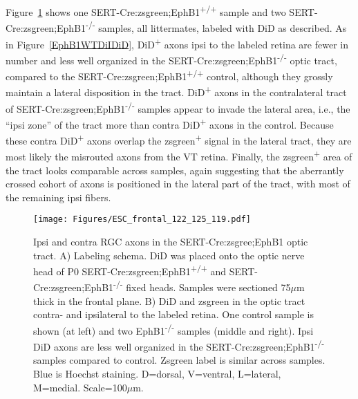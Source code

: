Figure~\ref{ESCfrontal} shows one SERT-Cre:zsgreen;EphB1\textsuperscript{+/+} sample and two SERT-Cre:zsgreen;EphB1\textsuperscript{-/-} samples, all littermates, labeled with DiD as described.
As in Figure~\ref{EphB1WTDiIDiD}, DiD\textsuperscript{+} axons ipsi to the labeled retina are fewer in number and less well organized in the SERT-Cre:zsgreen;EphB1\textsuperscript{-/-} optic tract, compared to the SERT-Cre:zsgreen;EphB1\textsuperscript{+/+} control, although they grossly maintain a lateral disposition in the tract.
DiD\textsuperscript{+} axons in the contralateral tract of SERT-Cre:zsgreen;EphB1\textsuperscript{-/-} samples appear to invade the lateral area, i.e., the ``ipsi zone'' of the tract more than contra DiD\textsuperscript{+} axons in the control.
Because these contra DiD\textsuperscript{+} axons overlap the zsgreen\textsuperscript{+} signal in the lateral tract, they are most likely the misrouted axons from the VT retina.
Finally, the zsgreen\textsuperscript{+} area of the tract looks comparable across samples, again suggesting that the aberrantly crossed cohort of axons is positioned in the lateral part of the tract, with most of the remaining ipsi fibers.
\begin{figure}[hbtp]
    \begin{center}
        \texttt{[image: Figures/ESC\_frontal\_122\_125\_119.pdf]}
        \caption[Ipsi and contra RGC axons in the SERT-Cre:zsgree;EphB1 optic tract.]
        {Ipsi and contra RGC axons in the SERT-Cre:zsgree;EphB1 optic tract.
        A) Labeling schema.
        DiD was placed onto the optic nerve head of P0 SERT-Cre:zsgreen;EphB1\textsuperscript{+/+} and SERT-Cre:zsgreen;EphB1\textsuperscript{-/-} fixed heads.
        Samples were sectioned 75$\mu$m thick in the frontal plane.
        B) DiD and zsgreen in the optic tract contra- and ipsilateral to the labeled retina.
        One control sample is shown (at left) and two EphB1\textsuperscript{-/-} samples (middle and right).
        Ipsi DiD axons are less well organized in the SERT-Cre:zsgreen;EphB1\textsuperscript{-/-} samples compared to control.
        Zsgreen label is similar across samples.
        Blue is Hoechst staining.
        D=dorsal, V=ventral, L=lateral, M=medial.
        Scale=100$\mu$m.}
        \label{ESCfrontal}
    \end{center}
\end{figure}


